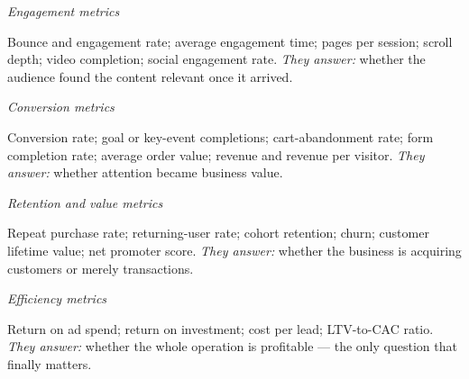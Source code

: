 \begin{qlist}
\textit{Engagement metrics}
\begin{apts}\setcounter{enumi}{1}
\item Bounce and engagement rate; average engagement time; pages per session;
      scroll depth; video completion; social engagement rate. \emph{They
      answer:} whether the audience found the content relevant once it arrived.
\end{apts}

\textit{Conversion metrics}
\begin{apts}\setcounter{enumi}{2}
\item Conversion rate; goal or key-event completions; cart-abandonment rate;
      form completion rate; average order value; revenue and revenue per
      visitor. \emph{They answer:} whether attention became business value.
\end{apts}

\textit{Retention and value metrics}
\begin{apts}\setcounter{enumi}{3}
\item Repeat purchase rate; returning-user rate; cohort retention; churn;
      customer lifetime value; net promoter score. \emph{They answer:} whether
      the business is acquiring customers or merely transactions.
\end{apts}

\textit{Efficiency metrics}
\begin{apts}\setcounter{enumi}{4}
\item Return on ad spend; return on investment; cost per lead; LTV-to-CAC
      ratio. \emph{They answer:} whether the whole operation is profitable ---
      the only question that finally matters.
\end{apts}


\end{qlist}
